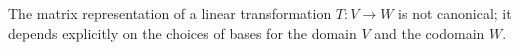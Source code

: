 \documentclass[11pt,openany]{article}
\renewcommand{\vec}[1]{\mathbf{#1}}
\begin{document}
\vspace{20pt}
\begin{remark*}
	The matrix representation of a linear transformation $T:V\to W$ is not canonical; it depends explicitly on the choices of bases for the domain $V$ and the codomain $W$.
\end{remark*}

\end{document}
